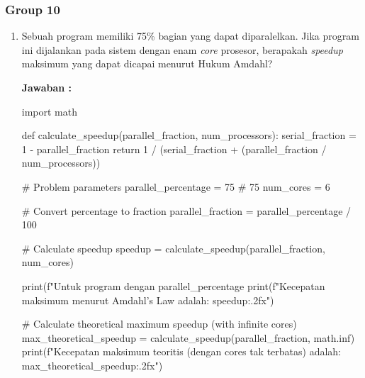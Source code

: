 \documentclass[12pt]{article}
\begin{document}
\subsubsection{Group 10}
\begin{enumerate}
    \item Sebuah program memiliki 75\% bagian yang dapat diparalelkan. Jika program ini dijalankan pada sistem dengan enam \textit{core} prosesor, berapakah \textit{speedup} maksimum yang dapat dicapai menurut Hukum Amdahl?

    \textbf{Jawaban : }
    \begin{python}
    import math

    def calculate_speedup(parallel_fraction, num_processors):
        serial_fraction = 1 - parallel_fraction
        return 1 / (serial_fraction + (parallel_fraction / num_processors))
    
    # Problem parameters
    parallel_percentage = 75  # 75%
    num_cores = 6
    
    # Convert percentage to fraction
    parallel_fraction = parallel_percentage / 100
    
    # Calculate speedup
    speedup = calculate_speedup(parallel_fraction, num_cores)
    
    print(f"Untuk program dengan {parallel_percentage}%
    print(f"Kecepatan maksimum menurut Amdahl's Law adalah: {speedup:.2f}x")
    
    # Calculate theoretical maximum speedup (with infinite cores)
    max_theoretical_speedup = calculate_speedup(parallel_fraction, math.inf)
    print(f"Kecepatan maksimum teoritis (dengan cores tak terbatas) adalah: {max_theoretical_speedup:.2f}x")
\end{python}


\end{enumerate}
\end{document}
